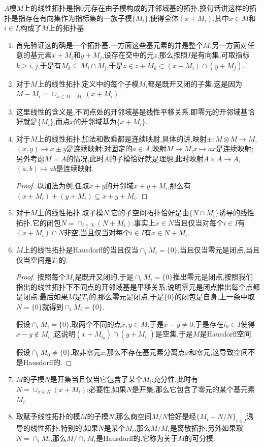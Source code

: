 $A$模$M$上的线性拓扑是指0元存在由子模构成的开邻域基的拓扑.换句话讲这样的拓扑是指存在有向集作为指标集的一族子模$\{M_i\}$,使得全体$(x+M_i)$,其中$x\in M$和$i\in I$,构成了$M$上的拓扑基.
\begin{enumerate}
	\item 首先验证这的确是一个拓扑基.一方面这些基元素的并是整个$M$,另一方面对任意的基元素$x+M_i$和$y+M_j$,设存在交中的元$z$,那么按照$I$是有向集,可取指标$k\ge i,j$,于是有$M_k\subseteq M_i\cap M_j$,于是$z\in z+M_k\subset(x+M_i)\cap(y+M_j)$.
	\item 对于$M$上的线性拓扑,定义中的每个子模$M_i$都是既开又闭的子集.这是因为$M-M_i=\cup_{x\in M-M_i}(x+M_i)$.
	\item 这里线性的含义是,不同点处的开邻域基是线性平移关系,即零元的开邻域基恰好就是$\{M_i\}$,而点$x$的开邻域基为$\{x+M_i\}$.
	\item 对于$M$上的线性拓扑,加法和数乘都是连续映射,具体的讲,映射$\pm:M\otimes M\to M$,$(x,y)\mapsto x\pm y$是连续映射;对固定的$a\in A$,映射$M\to M$,$x\mapsto ax$是连续映射;另外考虑$M=A$的情况,此时$A$的子模恰好就是理想,此时映射$A\times A\to A$,$(a,b)\mapsto ab$是连续映射.
	\begin{proof}
		
		以加法为例,任取$x+y$的开邻域$x+y+M_i$,那么有$(x+M_i)+(y+M_i)\subseteq x+y+M_i$.
	\end{proof}
	\item 对于$M$上的线性拓扑,取子模$N$,它的子空间拓扑恰好是由$\{N\cap M_i\}$诱导的线性拓扑.它的闭包$\overline{N}=\cap_{i\in N}(N+M_i)$:事实上$x\in\overline{N}$当且仅当对每个$i\in I$有$(x+M_i)\cap N$非空,当且仅当对每个$i\in I$有$x\in N+M_i$.
	\item $M$上的线性拓扑是Hausdorff的当且仅当$\cap_iM_i=\{0\}$,当且仅当零元是闭点,当且仅当空间是$T_1$的.
	\begin{proof}
		
		按照每个$M_i$是既开又闭的,于是$\cap_iM_i=\{0\}$推出零元是闭点,按照我们指出的线性拓扑下不同点的开邻域基是平移关系,说明零元是闭点推出每个点都是闭点.最后如果$M$是$T_1$的,那么零元是闭点,于是$\{0\}$的闭包是自身,上一条中取$N=\{0\}$就得到$\cap_iM_i=\{0\}$.
		
		假设$\cap_iM_i=\{0\}$,取两个不同的点$x,y\in M$,于是$x-y\not=0$,于是存在$i_0\in I$使得$x-y\not\in M_{i_0}$,这说明$(x+M_{i_0})\cap(y+M_{i_0})$是空集,于是$M$是Hausdorff空间.
		
		假设$\cap_iM_0\not=\{0\}$,取非零元$x$,那么不存在基元素分离点$x$和零元,这导致空间不是Hausdorff的.
	\end{proof}
	\item $M$的子模$N$是开集当且仅当它包含了某个$M_i$:充分性,此时有$N=\cup_{x\in N}(x+M_i)$;必要性,如果$N$是开集,那么它包含了零元的某个基元素$M_i$.
	\item 取赋予线性拓扑的模$M$的子模$N$,那么商空间$M/N$恰好是经$\{M_i+N/N\}_{i\in I}$诱导的线性拓扑.特别的,如果$N$是某个$M_i$,那么$M/M_i$是离散拓扑;另外如果取$N=\cap_iM_i$,那么$M/\cap_iM_i$是Hausdorff的,它称为关于$M$的可分模.
\end{enumerate}
